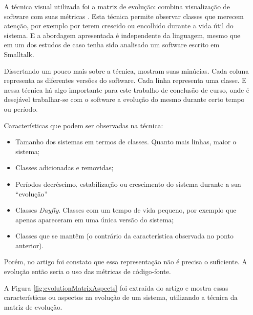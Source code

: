 A técnica visual utilizada foi a matriz de evolução: combina visualização de
software com suas métricas \cite{lanza2001evolution}. Esta técnica permite
observar classes que merecem atenção, por exemplo por terem crescido ou
encolhido durante a vida útil do sistema. E a abordagem apresentada é
independente da linguagem, mesmo que em um dos estudos de caso tenha sido
analisado um software escrito em Smalltalk.

Dissertando um pouco mais sobre a técnica, 
mostram suas minúcias. Cada coluna representa as diferentes versões do
software. Cada linha representa uma classe. E nessa técnica há algo importante
para este trabalho de conclusão de curso, onde é desejável trabalhar-se com o
software a evolução do mesmo durante certo tempo ou período.

Características que podem ser observadas na técnica:

\begin{itemize}
  \item Tamanho dos sistemas em termos de classes. Quanto mais linhas, maior o
  sistema;
  \item Classes adicionadas e removidas;
  \item Períodos decréscimo, estabilização ou crescimento do sistema durante a
  sua ``evolução''
  \item Classes \textit{Dayfly}. Classes com um tempo de vida pequeno, por
  exemplo que apenas apareceram em uma única versão do sistema;
  \item Classes que se mantêm (o contrário da característica observada no ponto
  anterior).
\end{itemize}

Porém, no artigo foi constato que essa representação não é precisa o suficiente.
A evolução então seria o uso das métricas de código-fonte.

A Figura \ref{fig:evolutionMatrixAspects} foi extraída do artigo e mostra essas
características ou aspectos na evolução de um sistema, utilizando a técnica da
matriz de evolução. 

